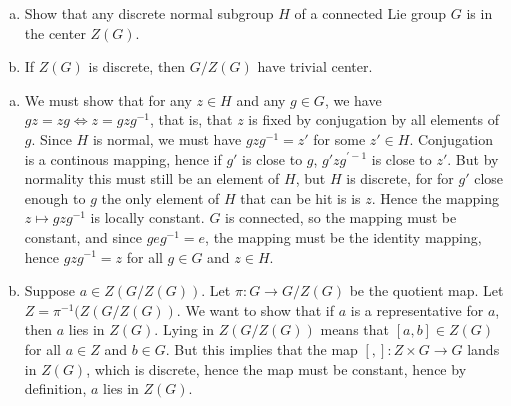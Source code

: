 \documentclass[11pt, english]{article}
\begin{document}
\begin{exc}[Exercise 7.11]
  \begin{enumerate}[a)]
  \item Show that any discrete normal subgroup $H$ of a connected Lie group $G$ is in the center $Z(G)$.
\item If $Z(G)$ is discrete, then $G/Z(G)$ have trivial center.
 \end{enumerate}
\end{exc}
\begin{sol}
  \begin{enumerate}[a)]
  \item We must show that for any $z \in H$ and any $g \in G$, we have $gz = zg \Leftrightarrow z = gzg^{-1}$, that is, that $z$ is fixed by conjugation by  all elements of $g$. Since $H$ is normal, we must have $gzg^{-1}=z'$ for some $z' \in H$. Conjugation is a continous mapping, hence if $g'$ is close to $g$, $g'zg^{'-1}$ is close to $z'$. But by normality this must still be an element of $H$, but $H$ is discrete, for for $g'$ close enough to $g$ the only element of $H$ that can be hit is is $z$. Hence the mapping $z \mapsto gzg^{-1}$ is locally constant. $G$ is connected, so the mapping must be constant, and since $geg^{-1}=e$, the mapping must be the identity mapping, hence $gzg^{-1}=z$ for all $g \in G$ and $z \in H$. 
\item Suppose $a \in Z(G/Z(G))$. Let $\pi:G \to G/Z(G)$ be the quotient map. Let $Z=\pi^{-1}(Z(G/Z(G))$. We want to show that if  $a$ is a representative for $a$, then $a$  lies in $Z(G)$. Lying in $Z(G/Z(G))$ means that $[a,b] \in Z(G)$ for all $a \in Z$ and $b \in G$. But this  implies that the map $[,]:Z \times G \to G$ lands in $Z(G)$, which is discrete, hence the map must be constant, hence by definition, $a$ lies in $Z(G)$.
  \end{enumerate}
\end{sol}
\end{document}
